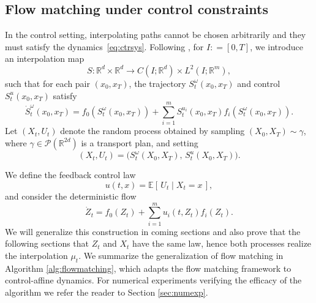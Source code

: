 \documentclass{article}
\begin{document}
\subsection{Flow matching under control constraints}

In the control setting, interpolating paths cannot be chosen arbitrarily and they must satisfy the 
dynamics~\eqref{eq:ctrsys}. Following \cite{elamvazhuthi2024benamou}, for $I : = [0,T]$, we introduce an interpolation 
map 
\[
S : \mathbb{R}^d \times \mathbb{R}^d \to C(I;\mathbb{R}^d) \times L^2(I;\mathbb{R}^m),
\]
such that for each pair $(x_0,x_T)$, the trajectory $S^\omega_t(x_0,x_T)$ and control 
$S^u_t(x_0,x_T)$ satisfy
\[
\dot{S}^\omega_t(x_0,x_T) = f_0(S^\omega_t(x_0,x_T)) + \sum_{i=1}^m 
S^{u_i}_t(x_0,x_T) f_i(S^\omega_t(x_0,x_T)).
\]
Let $(X_t,U_t)$ denote the random process obtained by sampling $(X_0,X_T) \sim \gamma$, where 
$\gamma \in \mathcal{P}(\mathbb{R}^{2d})$ is a transport plan, and setting
\[
(X_t,U_t) = \big(S^\omega_t(X_0,X_T),\, S^u_t(X_0,X_T)\big).
\]

We define the feedback control law
\[
u(t,x) = \mathbb{E}[\,U_t \mid X_t = x\,],
\]
and consider the deterministic flow
\begin{equation}
\dot{Z}_t = f_0(Z_t) + \sum_{i=1}^m u_i(t,Z_t) f_i(Z_t).
\label{eq:finalflow}
\end{equation}
We will generalize this construction in coming sections and also prove that the following sections that $Z_t$ and $X_t$ have the same law, hence both processes 
realize the interpolation $\mu_t$. We summarize the generalization of flow matching in Algorithm \ref{alg:flowmatching}, which adapts the flow matching framework to control-affine dynamics. For numerical experiments verifying the efficacy of the algorithm we refer the reader to Section \ref{sec:numexp}. 

   
      
\end{document}
